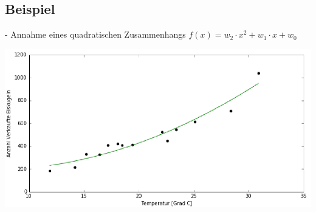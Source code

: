 \documentclass{report}
\begin{document}
\subsection{Beispiel}
- Annahme eines quadratischen Zusammenhangs $f(x) = w_2\cdot x^2 + w_1\cdot x + w_0$
\begin{center}
  \includegraphics[scale=.295]{ml02_6}
\end{center}
\end{document}
